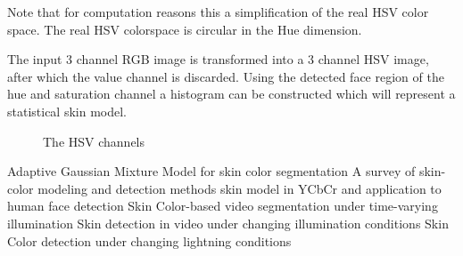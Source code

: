 Note that for computation reasons this a simplification of the real HSV color space. The real HSV colorspace is circular in the Hue dimension.

The input 3 channel RGB image is transformed into a 3 channel HSV image, after which the value channel is discarded. Using the detected face region of the hue and saturation channel a histogram can be constructed which will represent a statistical skin model.

\begin{figure}[htbp]
  \centering
{}
\hspace{0.03\linewidth}
\hspace{0.03\linewidth}
  \caption{The HSV channels}
  \label{fig:hsvchannels}
\end{figure}



Adaptive Gaussian Mixture Model for skin color segmentation \cite{Hassanpour2008}
A survey of skin-color modeling and detection methods \cite{Kakumanu2007}
skin model in YCbCr and application to human face detection \cite{Phung2002}
Skin Color-based video segmentation under time-varying illumination \cite{Sigal2004}
Skin detection in video under changing illumination conditions \cite{Soriano2000}
Skin Color detection under changing lightning conditions \cite{Stoerring1999}




